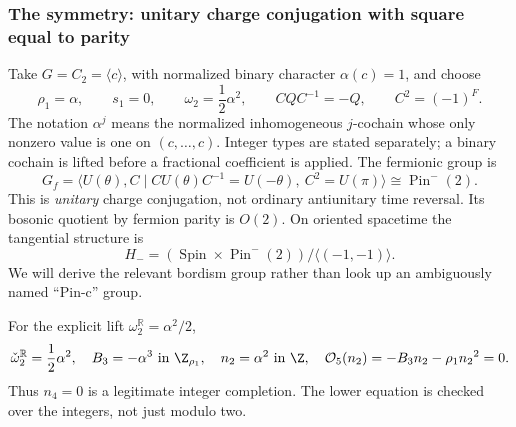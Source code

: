 \subsubsection{The symmetry: unitary charge conjugation with square equal to parity}
Take $G=C_2=\langle c\rangle$, with normalized binary character $\alpha(c)=1$, and choose
\begin{equation}\label{eq:Hminus-background06}
 {\rho_1}=\alpha,\qquad {s_1}=0,\qquad
 \omega_2=\frac12\alpha^2,\qquad
 CQC^{-1}=-Q,\qquad C^2=(-1)^F.
\end{equation}
The notation $\alpha^j$ means the normalized inhomogeneous $j$-cochain whose only nonzero value is one on $(c,\ldots,c)$. Integer types are stated separately; a binary cochain is lifted before a fractional coefficient is applied. The fermionic group is
\begin{equation}
 G_f=\langle U(\theta),C\mid C U(\theta)C^{-1}=U(-\theta),\ C^2=U(\pi)\rangle
      \cong\operatorname{Pin}^{-}(2).
\end{equation}
This is \emph{unitary} charge conjugation, not ordinary antiunitary time reversal. Its bosonic quotient by fermion parity is $O(2)$. On oriented spacetime the tangential structure is
\begin{equation}\label{eq:Hminus06}
 H_-=(\operatorname{Spin}\times\operatorname{Pin}^{-}(2))/\langle(-1,-1)\rangle.
\end{equation}
We will derive the relevant bordism group rather than look up an ambiguously named ``Pin-c'' group.

For the explicit lift $\omega_2^{\mathbb R}=\alpha^2/2$,
\begin{equation}\label{eq:C2-lower06}
 \check\omega_2^{\mathbb R}=\frac12\alpha^2,\quad B_3=-\alpha^3\ \text{in }\Z_{\rho_1},
 \quad n_2=\alpha^2\ \text{in }\Z,
 \quad \mathcal O_5({n_2})=-B_3{n_2}-{\rho_1}{n_2}^2=0.
\end{equation}
Thus $n_4=0$ is a legitimate integer completion. The lower equation is checked over the integers, not just modulo two.


